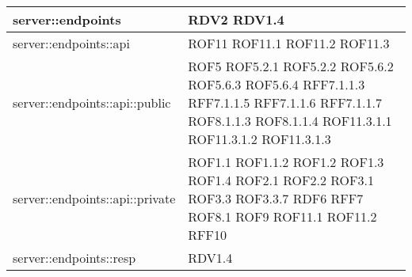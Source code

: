 \begin{center}
\begin{longtable}{| p{9cm} | p{4cm} |}
\hline
server::endpoints  &  RDV2 \newline RDV1.4 \newline \\
\hline
server::endpoints::api  &  ROF11 \newline ROF11.1 \newline ROF11.2 \newline ROF11.3 \newline \\
\hline
server::endpoints::api::public  &  ROF5 \newline ROF5.2.1 \newline ROF5.2.2 \newline ROF5.6.2 \newline ROF5.6.3 \newline ROF5.6.4 \newline RFF7.1.1.3 \newline RFF7.1.1.5 \newline RFF7.1.1.6 \newline RFF7.1.1.7 \newline ROF8.1.1.3 \newline  ROF8.1.1.4 \newline ROF11.3.1.1 \newline ROF11.3.1.2 \newline ROF11.3.1.3  \newline \\
\hline
server::endpoints::api::private  &  ROF1.1 \newline ROF1.1.2 \newline ROF1.2 \newline ROF1.3 \newline ROF1.4 \newline ROF2.1 \newline ROF2.2 \newline ROF3.1 \newline ROF3.3 \newline ROF3.3.7 \newline RDF6 \newline RFF7 \newline ROF8.1 \newline ROF9 \newline ROF11.1 \newline ROF11.2  \newline RFF10 \newline \\
\hline
server::endpoints::resp  &  RDV1.4 \newline \\

\end{longtable}
\end{center}
